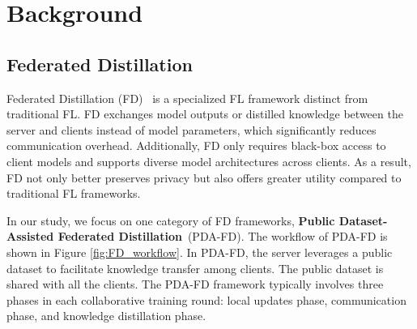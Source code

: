 \section{Background}
\label{sec:background}
\subsection{Federated Distillation}
\label{sec:background_fd}

Federated Distillation (FD)~\cite{li2019fedmd, itahara2021distillation, chang2019cronus, jeong2018communication, sui2020feded} is a specialized FL framework distinct from traditional FL. 
FD exchanges model outputs or distilled knowledge between the server and clients instead of model parameters, which significantly reduces communication overhead.
Additionally, FD only requires black-box access to client models and supports diverse model architectures across clients. 
As a result, FD not only better preserves privacy but also offers greater utility compared to traditional FL frameworks.

In our study, we focus on one category of FD frameworks, \textbf{Public Dataset-Assisted Federated Distillation}~\cite{li2019fedmd, itahara2021distillation, chang2019cronus}(PDA-FD).
The workflow of PDA-FD is shown in Figure \ref{fig:FD_workflow}.
In PDA-FD, the server leverages a public dataset to facilitate knowledge transfer among clients. 
The public dataset is shared with all the clients. 
The PDA-FD framework typically involves three phases in each collaborative training round: local updates phase, communication phase, and knowledge distillation phase.

